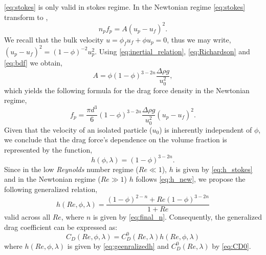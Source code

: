 \ref{eq:stokes} is only valid in stokes regime. 
In the Newtonian regime \ref{eq:stokes} transform to \citep{jackson2000}, 
\begin{equation}
    n_p f_p = A (u_p - u_f)^2. 
    \label{eq:inertial_relation}
\end{equation}
We recall that the bulk velocity $u= \phi_f u_f + \phi u_p = 0$, thus we may write, $(u_p - u_f)^2 = (1-\phi)^{-2} u_p^2$. 
Using \ref{eq:inertial_relation}, \ref{eq:Richardson} and \ref{eq:bdf} we obtain, 
\begin{equation*}
    A = \phi (1- \phi)^{3-2n}\frac{\Delta \rho g}{u_0^2},
\end{equation*}
which yields the following formula for the drag force density in the Newtonian regime, 
\begin{equation}
     f_p =\frac{ \pi d^3}{6}  (1- \phi)^{3-2n}\frac{\Delta \rho g}{u_0^2} (u_p - u_f)^2. 
\end{equation}
Given that the velocity of an isolated particle ($u_0$) is inherently independent of $\phi$, we conclude that the drag force's dependence on the volume fraction is represented by the function, 
\begin{equation}
    h(\phi,\lambda)
    = 
    (1-\phi)^{3- 2n}.
    \label{eq:h_new}
\end{equation}
Since in the low \textit{Reynolds} number regime ($Re\ll 1$), $h$ is given by \ref{eq:h_stokes} and in the Newtonian regime ($Re \gg 1$) $h$  follows \ref{eq:h_new}, we propose the following generalized relation,
\begin{equation}
    h(Re,\phi,\lambda)
    = \frac{(1-\phi)^{2-n}+ Re (1-\phi)^{3-2n}}{1+Re}
    \label{eq:geenralizedh}
\end{equation}
valid across all $Re$, where $n$ is given by \ref{eq:final_n}. 
Consequently, the generalized drag coefficient can be expressed as:
\begin{equation}
    C_D(Re,\phi,\lambda)
    = 
    C_D^0(Re,\lambda)
    h(Re,\phi,\lambda)
    \label{eq:C_d_finalRe}
\end{equation}
where $h(Re,\phi,\lambda)$ is given by \ref{eq:geenralizedh} and $C_D^0(Re,\lambda)$ by \ref{eq:CD0}. 


